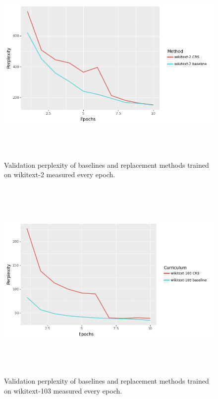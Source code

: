 \begin{figure}[h]
\centering
\includegraphics[height=10cm]{Thesis/images/wikitext-2BS.png}
\caption{Validation perplexity of baselines and replacement methods trained on wikitext-2 measured every epoch.}
\label{fig:cs-perp-2}
\end{figure}
\begin{figure}[h]
\centering
\includegraphics[height=10cm]{Thesis/images/wikitext-103BS.png}
\caption{Validation perplexity of baselines and replacement methods trained on wikitext-103 measured every epoch.}
\label{fig:cs-perp-103}
\end{figure}
